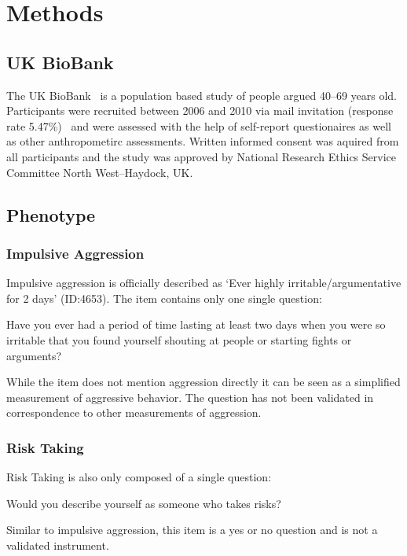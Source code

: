 \section{Methods}
\label{sec:methods}

\subsection{UK BioBank}
\label{sub:uk_biobank}
The UK BioBank~\cite{Allen2014} is a population based study of people argued 40--69 years old. 
Participants were recruited between 2006 and 2010 via mail invitation (response rate 5.47\%)~\cite{Sudlow2015} and were assessed with the help of self-report questionaires as well as other anthropometirc assessments.
Written informed consent was aquired from all participants and the study was approved by National Research Ethics Service Committee North West–Haydock, UK.

\subsection{Phenotype}
\label{sub:phenotype}

\subsubsection{Impulsive Aggression}
\label{ssub:impulsive_aggression}
Impulsive aggression is officially described as `Ever highly irritable/argumentative for 2 days' (ID:\@ 4653).
The item contains only one single question: 
\begin{displayquote}
  Have you ever had a period of time lasting at least two days when you were so irritable that you found yourself shouting at people or starting fights or arguments?
\end{displayquote}
While the item does not mention aggression directly it can be seen as a simplified measurement of aggressive behavior.
The question has not been validated in correspondence to other measurements of aggression.

\subsubsection{Risk Taking}
\label{ssub:risk_taking}
Risk Taking is also only composed of a single question:
\begin{displayquote}
  Would you describe yourself as someone who takes risks?
\end{displayquote}
Similar to impulsive aggression, this item is a yes or no question and is not a validated instrument.


